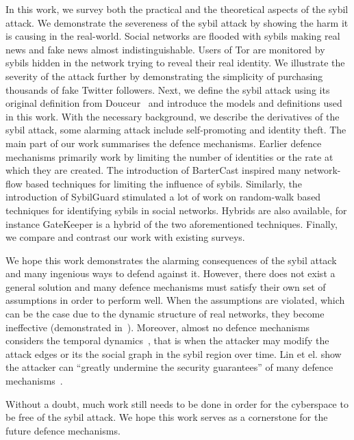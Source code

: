 In this work, we survey both the practical and the theoretical aspects of the
sybil attack. We demonstrate the severeness of the sybil attack by showing the
harm it is causing in the real-world. Social networks are flooded with sybils
making real news and fake news almost indistinguishable. Users of Tor are
monitored by sybils hidden in the network trying to reveal their real identity.
We illustrate the severity of the attack further by demonstrating the simplicity
of purchasing thousands of fake Twitter followers. Next, we define the sybil
attack using its original definition from Douceur~\cite{douceur2002sybil} and
introduce the models and definitions used in this work. With the necessary
background, we describe the derivatives of the sybil attack, some alarming
attack include self-promoting and identity theft. The main part of our work
summarises the defence mechanisms. Earlier defence mechanisms primarily work by
limiting the number of identities or the rate at which they are created. The
introduction of BarterCast inspired many network-flow based techniques for
limiting the influence of sybils. Similarly, the introduction of SybilGuard
stimulated a lot of work on random-walk based techniques for identifying sybils
in social networks. Hybrids are also available, for instance GateKeeper is a
hybrid of the two aforementioned techniques. Finally, we compare and contrast
our work with existing surveys.

We hope this work demonstrates the alarming consequences of the sybil attack and
many ingenious ways to defend against it. However, there does not exist a
general solution and many defence mechanisms must satisfy their own set of
assumptions in order to perform well. When the assumptions are violated, which
can be the case due to the dynamic structure of real networks, they become
ineffective (demonstrated in~\cite{liu2016smartwalk}). Moreover, almost no
defence mechanisms considers the temporal dynamics~\cite{liu2015exploiting},
that is when the attacker may modify the attack edges or its the social graph in
the sybil region over time. Lin et el. show the attacker can ``greatly undermine
the security guarantees'' of many defence mechanisms~\cite{liu2015exploiting}.

Without a doubt, much work still needs to be done in order for the cyberspace to
be free of the sybil attack. We hope this work serves as a cornerstone for the
future defence mechanisms.

